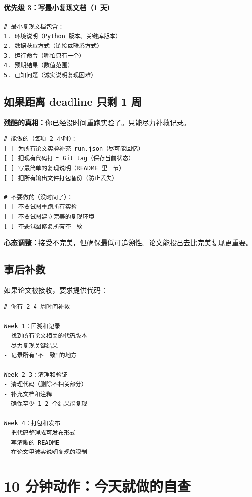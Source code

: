 \paragraph{优先级 3：写最小复现文档（1 天）}

\begin{verbatim}
# 最小复现文档包含：
1. 环境说明（Python 版本、关键库版本）
2. 数据获取方式（链接或联系方式）
3. 运行命令（哪怕只有一个）
4. 预期结果（数值范围）
5. 已知问题（诚实说明复现困难）
\end{verbatim}

\subsection{如果距离 deadline 只剩 1 周}

\textbf{残酷的真相：}你已经没时间重跑实验了。只能尽力补救记录。

\begin{verbatim}
# 能做的（每项 2 小时）：
[ ] 为所有论文实验补充 run.json（尽可能回忆）
[ ] 把现有代码打上 Git tag（保存当前状态）
[ ] 写最简单的复现说明（README 里一节）
[ ] 把所有输出文件打包备份（防止丢失）

# 不要做的（没时间了）：
[ ] 不要试图重跑所有实验
[ ] 不要试图建立完美的复现环境
[ ] 不要试图修复所有不一致
\end{verbatim}

\textbf{心态调整：}接受不完美，但确保最低可追溯性。论文能投出去比完美复现更重要。

\subsection{事后补救}

如果论文被接收，要求提供代码：

\begin{verbatim}
# 你有 2-4 周时间补救

Week 1：回溯和记录
- 找到所有论文相关的代码版本
- 尽力复现关键结果
- 记录所有"不一致"的地方

Week 2-3：清理和验证
- 清理代码（删除不相关部分）
- 补充文档和注释
- 确保至少 1-2 个结果能复现

Week 4：打包和发布
- 把代码整理成可发布形式
- 写清晰的 README
- 在论文里诚实说明复现的限制
\end{verbatim}

\section{10 分钟动作：今天就做的自查}

